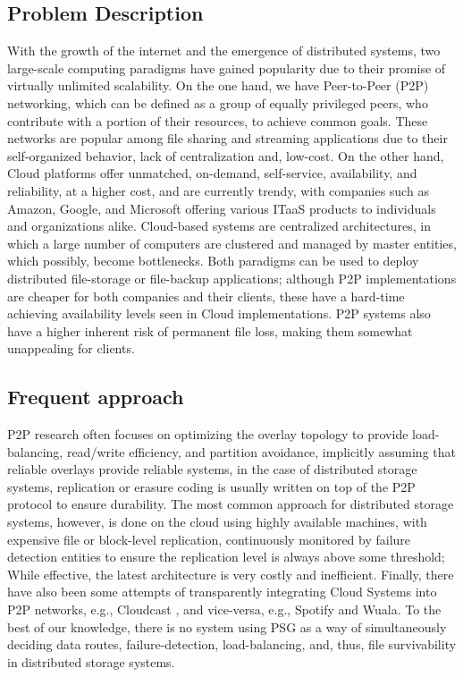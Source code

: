 \documentclass[runningheads]{llncs}
\begin{document}
\subsection{Problem Description}
With the growth of the internet and the emergence of distributed systems, two large-scale computing paradigms have gained popularity due to their promise of virtually unlimited scalability. On the one hand, we have Peer-to-Peer (P2P) networking, which can be defined as a group of equally privileged peers, who contribute with a portion of their resources, to achieve common goals. These networks are popular among file sharing and streaming applications due to their self-organized behavior, lack of centralization and, low-cost. On the other hand, Cloud platforms offer unmatched, on-demand, self-service, availability, and reliability, at a higher cost, and are currently trendy, with companies such as Amazon, Google, and Microsoft offering various ITaaS products to individuals and organizations alike. Cloud-based systems are centralized architectures, in which a large number of computers are clustered and managed by master entities, which possibly, become bottlenecks. Both paradigms can be used to deploy distributed file-storage or file-backup applications; although P2P implementations are cheaper for both companies and their clients, these have a hard-time achieving availability levels seen in Cloud implementations. P2P systems also have a higher inherent risk of permanent file loss, making them somewhat unappealing for clients.

\subsection{Frequent approach}
P2P research often focuses on optimizing the overlay topology to provide load-balancing, read/write efficiency, and partition avoidance, implicitly assuming that reliable overlays provide reliable systems, in the case of distributed storage systems, replication or erasure coding is usually written on top of the P2P protocol to ensure durability. The most common approach for distributed storage systems, however, is done on the cloud using highly available machines, with expensive file or block-level replication, continuously monitored by failure detection entities to ensure the replication level is always above some threshold; While effective, the latest architecture is very costly and inefficient. Finally, there have also been some attempts of transparently integrating Cloud Systems into P2P networks, e.g., Cloudcast \cite{cloudcast}, and vice-versa, e.g., Spotify\cite{spotify} and Wuala\cite{wuala}. To the best of our knowledge, there is no system using PSG as a way of simultaneously deciding data routes, failure-detection, load-balancing, and, thus, file survivability in distributed storage systems.
\end{document}

